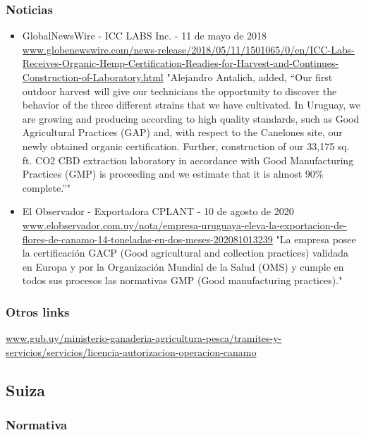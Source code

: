 \documentclass{article}
\begin{document}
\subsubsection{Noticias}

\begin{itemize}
	
	\item GlobalNewsWire - ICC LABS Inc. - 11 de mayo de 2018
	\subitem \url{www.globenewswire.com/news-release/2018/05/11/1501065/0/en/ICC-Labs-Receives-Organic-Hemp-Certification-Readies-for-Harvest-and-Continues-Construction-of-Laboratory.html}
	\subitem "Alejandro Antalich, added, “Our first outdoor harvest will give our technicians the opportunity to discover the behavior of the three different strains that we have cultivated. In Uruguay, we are growing and producing according to high quality standards, such as Good Agricultural Practices (GAP) and, with respect to the Canelones site, our newly obtained organic certification. Further, construction of our 33,175 sq. ft. CO2 CBD extraction laboratory in accordance with Good Manufacturing Practices (GMP) is proceeding and we estimate that it is almost 90\% complete.”"
	
	\item El Observador - Exportadora CPLANT - 10 de agosto de 2020
	\subitem \url{www.elobservador.com.uy/nota/empresa-uruguaya-eleva-la-exportacion-de-flores-de-canamo-14-toneladas-en-dos-meses-202081013239}
	\subitem "La empresa posee la certificación GACP (Good agricultural and collection practices) validada en Europa y por la Organización Mundial de la Salud (OMS) y cumple en todos sus procesos las normativas GMP (Good manufacturing practices)."
\end{itemize}

\subsubsection{Otros links}

\url{www.gub.uy/ministerio-ganaderia-agricultura-pesca/tramites-y-servicios/servicios/licencia-autorizacion-operacion-canamo}

\newpage

\subsection{Suiza}

\subsubsection{Normativa}
\end{document}
